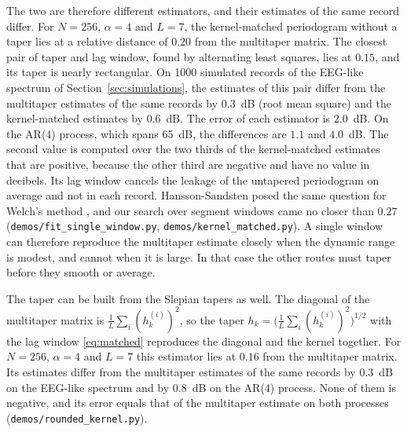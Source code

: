 \documentclass[10pt,twocolumn]{article}
\begin{document}
The two are therefore different estimators, and their estimates of the same record differ. For $N=256$, $\alpha=4$ and $L=7$, the kernel-matched periodogram without a taper lies at a relative distance of $0.20$ from the multitaper matrix. The closest pair of taper and lag window, found by alternating least squares, lies at $0.15$, and its taper is nearly rectangular. On 1000 simulated records of the EEG-like spectrum of Section~\ref{sec:simulations}, the estimates of this pair differ from the multitaper estimates of the same records by $0.3$~dB (root mean square) and the kernel-matched estimates by $0.6$~dB. The error of each estimator is $2.0$~dB. On the AR(4) process, which spans 65~dB, the differences are $1.1$ and $4.0$~dB. The second value is computed over the two thirds of the kernel-matched estimates that are positive, because the other third are negative and have no value in decibels. Its lag window cancels the leakage of the untapered periodogram on average and not in each record. Hansson-Sandsten posed the same question for Welch's method \cite{hansson2012}, and our search over segment windows came no closer than $0.27$ (\texttt{demos/fit\_single\_window.py}, \texttt{demos/kernel\_matched.py}). A single window can therefore reproduce the multitaper estimate closely when the dynamic range is modest, and cannot when it is large. In that case the other routes must taper before they smooth or average.

The taper can be built from the Slepian tapers as well. The diagonal of the multitaper matrix is $\frac1L\sum_i(h^{(i)}_k)^2$, so the taper $h_k=\bigl(\frac1L\sum_i(h^{(i)}_k)^2\bigr)^{1/2}$ with the lag window \eqref{eq:matched} reproduces the diagonal and the kernel together. For $N=256$, $\alpha=4$ and $L=7$ this estimator lies at $0.16$ from the multitaper matrix. Its estimates differ from the multitaper estimates of the same records by $0.3$~dB on the EEG-like spectrum and by $0.8$~dB on the AR(4) process. None of them is negative, and its error equals that of the multitaper estimate on both processes (\texttt{demos/rounded\_kernel.py}).
\end{document}
